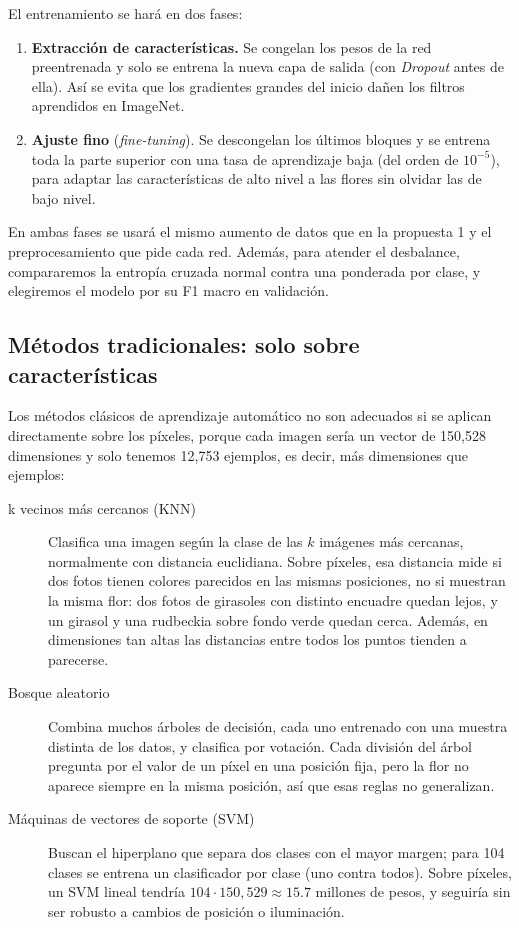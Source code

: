 El entrenamiento se hará en dos fases:
\begin{enumerate}
    \item \textbf{Extracción de características.} Se congelan los pesos de la red preentrenada y solo se entrena la nueva capa de salida (con \textit{Dropout} antes de ella). Así se evita que los gradientes grandes del inicio dañen los filtros aprendidos en ImageNet.
    \item \textbf{Ajuste fino} (\textit{fine-tuning}). Se descongelan los últimos bloques y se entrena toda la parte superior con una tasa de aprendizaje baja (del orden de $10^{-5}$), para adaptar las características de alto nivel a las flores sin olvidar las de bajo nivel.
\end{enumerate}

En ambas fases se usará el mismo aumento de datos que en la propuesta 1 y el preprocesamiento que pide cada red. Además, para atender el desbalance, compararemos la entropía cruzada normal contra una ponderada por clase, y elegiremos el modelo por su F1 macro en validación.

\subsection{Métodos tradicionales: solo sobre características}

Los métodos clásicos de aprendizaje automático no son adecuados si se aplican directamente sobre los píxeles, porque cada imagen sería un vector de 150,528 dimensiones y solo tenemos 12,753 ejemplos, es decir, más dimensiones que ejemplos:

\begin{description}
    \item[k vecinos más cercanos (KNN)] Clasifica una imagen según la clase de las $k$ imágenes más cercanas, normalmente con distancia euclidiana. Sobre píxeles, esa distancia mide si dos fotos tienen colores parecidos en las mismas posiciones, no si muestran la misma flor: dos fotos de girasoles con distinto encuadre quedan lejos, y un girasol y una rudbeckia sobre fondo verde quedan cerca. Además, en dimensiones tan altas las distancias entre todos los puntos tienden a parecerse.
    \item[Bosque aleatorio] Combina muchos árboles de decisión, cada uno entrenado con una muestra distinta de los datos, y clasifica por votación. Cada división del árbol pregunta por el valor de un píxel en una posición fija, pero la flor no aparece siempre en la misma posición, así que esas reglas no generalizan.
    \item[Máquinas de vectores de soporte (SVM)] Buscan el hiperplano que separa dos clases con el mayor margen; para 104 clases se entrena un clasificador por clase (uno contra todos). Sobre píxeles, un SVM lineal tendría $104\cdot150{,}529\approx15.7$ millones de pesos, y seguiría sin ser robusto a cambios de posición o iluminación.
\end{description}

